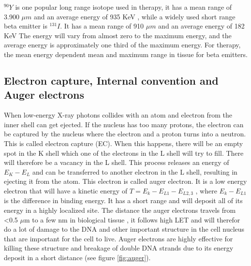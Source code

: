 \documentclass[twoside,english]{uiofysmaster/uiofysmaster}
\begin{document}
$^{90}Y$ is one popular long range isotope used in therapy, it has a mean range of 3.900 $\mu m$ and an average energy of 935 KeV%
, while a widely used short range beta emitter is $^{131}I$. It has a mean range of 910 $\mu m$ and an average energy of 182 KeV%
 The energy will vary from almost zero to the maximum energy, and the average energy is approximately one third of the maximum energy. For therapy, the mean energy dependent mean and maximum range in tissue for beta emitters. 



\subsection{Electron capture, Internal convention and Auger electrons}

When low-energy X-ray photons collides with an atom and electron from the inner shell can get ejected. If the nucleus has too many protons, the electron can be captured by the nucleus where the electron and a proton turns into a neutron. This is called electron capture (EC). When this happens, there will be an empty spot in the K shell which one of the electrons in the L shell will try to fill. There will therefore be a vacancy in the L shell. This process releases an energy of $E_K - E_{L}$ and can be transferred to another electron in the L shell, resulting in ejecting it from the atom. This electron is called auger electron. It is a low energy electron that will have a kinetic energy of $T = E_k - E_{L1} - E_{L2,3}$ \cite{medical}, where $E_k - E_{L1}$ is the difference in binding energy. It has a short range and will deposit all of its energy in a highly localized site. The distance the auger electrons travels from <0.5 $\mu$m to a few nm in biological tissue \cite{augerelectrons}, it follows high LET and will therefor do a lot of damage to the DNA and other important structure in the cell nucleus that are important for the cell to live. Auger electrons are highly effective for killing these structure and breakage of double DNA strands due to its energy deposit in a short distance (see figure \ref{fig:auger}).
\noindent
\end{document}
